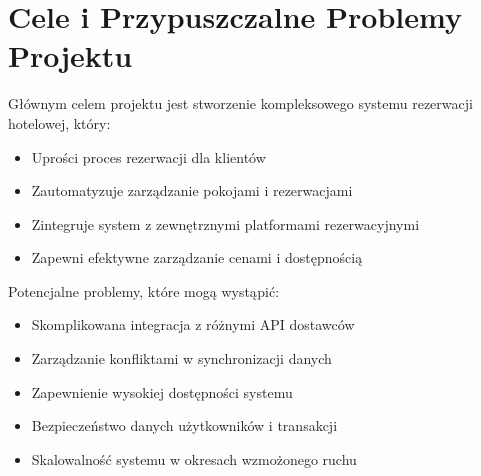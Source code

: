 \section{Cele i Przypuszczalne Problemy Projektu}

Głównym celem projektu jest stworzenie kompleksowego systemu rezerwacji hotelowej, który:
\begin{itemize}
    \item Uprości proces rezerwacji dla klientów
    \item Zautomatyzuje zarządzanie pokojami i rezerwacjami
    \item Zintegruje system z zewnętrznymi platformami rezerwacyjnymi
    \item Zapewni efektywne zarządzanie cenami i dostępnością
\end{itemize}

Potencjalne problemy, które mogą wystąpić:
\begin{itemize}
    \item Skomplikowana integracja z różnymi API dostawców
    \item Zarządzanie konfliktami w synchronizacji danych
    \item Zapewnienie wysokiej dostępności systemu
    \item Bezpieczeństwo danych użytkowników i transakcji
    \item Skalowalność systemu w okresach wzmożonego ruchu
\end{itemize}
